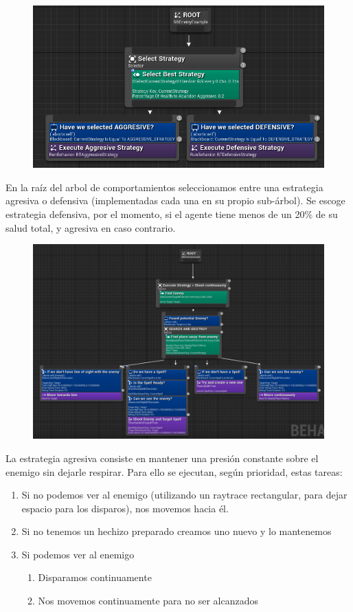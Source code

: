 \documentclass[12pt]{report}
\begin{document}
\begin{figure}[h]
    \centering
    \includegraphics[width=1\textwidth]{base_behavior_tree}
\end{figure}

En la raíz del arbol de comportamientos seleccionamos entre una estrategia agresiva o defensiva (implementadas cada una en su propio sub-árbol). Se escoge estrategia defensiva, por el momento, si el agente tiene menos de un 20\% de su salud total, y agresiva en caso contrario.

\begin{figure}[H]
    \centering
    \includegraphics[width=1\textwidth]{aggresive_behavior_tree}
\end{figure}

La estrategia agresiva consiste en mantener una presión constante sobre el enemigo sin dejarle respirar. Para ello se ejecutan, según prioridad, estas tareas:

\begin{enumerate}
	\item Si no podemos ver al enemigo (utilizando un raytrace rectangular, para dejar espacio para los disparos), nos movemos hacia él.
	\item Si no tenemos un hechizo preparado creamos uno nuevo y lo mantenemos
	\item Si podemos ver al enemigo
	\begin{enumerate}
		\item Disparamos continuamente
		\item Nos movemos continuamente para no ser alcanzados
	\end{enumerate}
\end{enumerate}
\end{document}
